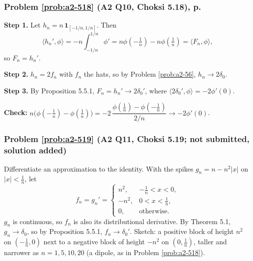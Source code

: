 \documentclass{article}
\newcommand{\ip}[2]{\langle #1, #2 \rangle}
\begin{document}
\label{sol:a2-518}
\subsubsection*{Problem \ref{prob:a2-518} (A2 Q10, Choksi 5.18), p.~\pageref{prob:a2-518}}
\textbf{Step 1.} Let $h_n = n\,\mathbf{1}_{[-1/n,1/n]}$. Then
\begin{equation*}
    \ip{h_n'}{\phi} = -n\int_{-1/n}^{1/n}\phi' = n\phi(-\tfrac1n) - n\phi(\tfrac1n) = \ip{F_n}{\phi},
\end{equation*}
so $F_n = h_n'$.\par
\textbf{Step 2.} $h_n = 2f_n$ with $f_n$ the hats, so by Problem \ref{prob:a2-56}, $h_n \to 2\delta_0$.\par
\textbf{Step 3.} By Proposition 5.5.1, $F_n = h_n' \to 2\delta_0'$, where $\ip{2\delta_0'}{\phi} = -2\phi'(0)$.\par
\textbf{Check:} $n\big(\phi(-\frac1n) - \phi(\frac1n)\big) = -2\,\dfrac{\phi(\frac1n) - \phi(-\frac1n)}{2/n} \to -2\phi'(0)$.

\label{sol:a2-519}
\subsubsection*{Problem \ref{prob:a2-519} (A2 Q11, Choksi 5.19; not submitted, solution added)}
Differentiate an approximation to the identity. With the spikes $g_n = n - n^2|x|$ on $|x| < \frac1n$, let
\begin{equation*}
    f_n = g_n' = \begin{cases} n^2, & -\frac1n < x < 0, \\ -n^2, & 0 < x < \frac1n, \\ 0, & \text{otherwise}. \end{cases}
\end{equation*}
$g_n$ is continuous, so $f_n$ is also its distributional derivative. By Theorem 5.1, $g_n \to \delta_0$, so by Proposition 5.5.1, $f_n \to \delta_0'$. Sketch: a positive block of height $n^2$ on $(-\frac1n, 0)$ next to a negative block of height $-n^2$ on $(0, \frac1n)$, taller and narrower as $n = 1, 5, 10, 20$ (a dipole, as in Problem \ref{prob:a2-518}).

\label{sol:a2-d1}
\end{document}
